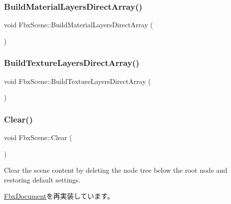 \subsubsection{\texorpdfstring{Build\+Material\+Layers\+Direct\+Array()}{BuildMaterialLayersDirectArray()}}
{\footnotesize\ttfamily void Fbx\+Scene\+::\+Build\+Material\+Layers\+Direct\+Array (\begin{DoxyParamCaption}{ }\end{DoxyParamCaption})}

\mbox{\label{class_fbx_scene_a27a6d24089178bc992f59787aef9d319}} 
\subsubsection{\texorpdfstring{Build\+Texture\+Layers\+Direct\+Array()}{BuildTextureLayersDirectArray()}}
{\footnotesize\ttfamily void Fbx\+Scene\+::\+Build\+Texture\+Layers\+Direct\+Array (\begin{DoxyParamCaption}{ }\end{DoxyParamCaption})}

\mbox{\label{class_fbx_scene_ab578ff733eb8f6af89ff1645852966cd}} 
\subsubsection{\texorpdfstring{Clear()}{Clear()}}
{\footnotesize\ttfamily void Fbx\+Scene\+::\+Clear (\begin{DoxyParamCaption}{ }\end{DoxyParamCaption})\hspace{0.3cm}{\ttfamily [virtual]}}



Clear the scene content by deleting the node tree below the root node and restoring default settings. 



\hyperlink{class_fbx_document_ac8fa73e98a73c4f6637466e58d069bbe}{Fbx\+Document}を再実装しています。

\mbox{\label{class_fbx_scene_acee728f921bf4e25f6f8accf3446b079}} 
